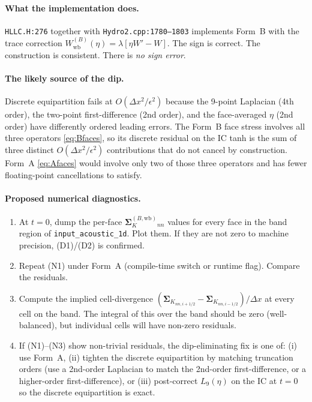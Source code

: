 \documentclass[11pt]{article}
\newcommand{\SK}{\boldsymbol{\Sigma}_K}
\newcommand{\Wb}{W_{\!\mathrm{wb}}}
\begin{document}
\paragraph{What the implementation does.} \texttt{HLLC.H:276} together
with \texttt{Hydro2.cpp:1780--1803} implements Form~B with the trace
correction $\Wb^{(B)}(\eta)=\lambda[\eta W' - W]$. The sign is correct.
The construction is consistent. There is \emph{no sign error}.

\paragraph{The likely source of the dip.}
Discrete equipartition fails at $O(\Delta x^2/\epsilon^2)$ because the
9-point Laplacian (4th order), the two-point first-difference (2nd
order), and the face-averaged $\eta$ (2nd order) have differently
ordered leading errors. The Form~B face stress involves all three
operators \eqref{eq:Bfaces}, so its discrete residual on the IC tanh is
the sum of three distinct $O(\Delta x^2/\epsilon^2)$ contributions
that do not cancel by construction. Form~A \eqref{eq:Afaces} would
involve only two of those three operators and has fewer floating-point
cancellations to satisfy.

\paragraph{Proposed numerical diagnostics.}
\begin{enumerate}
\item[(N1)] At $t=0$, dump the per-face $\SK^{(B,\mathrm{wb})}_{nn}$ values for every face in the band region of \texttt{input\_acoustic\_1d}. Plot them. If they are not zero to machine precision, (D1)/(D2) is confirmed.
\item[(N2)] Repeat (N1) under Form~A (compile-time switch or runtime flag). Compare the residuals.
\item[(N3)] Compute the implied cell-divergence
$(\SK_{nn,i+1/2} - \SK_{nn,i-1/2})/\Delta x$ at every cell on the band. The integral of this over the band should be zero (well-balanced), but individual cells will have non-zero residuals.
\item[(N4)] If (N1)--(N3) show non-trivial residuals, the dip-eliminating fix is one of: (i) use Form~A, (ii) tighten the discrete equipartition by matching truncation orders (use a 2nd-order Laplacian to match the 2nd-order first-difference, or a higher-order first-difference), or (iii) post-correct $L_9(\eta)$ on the IC at $t=0$ so the discrete equipartition is exact.
\end{enumerate}
\end{document}
